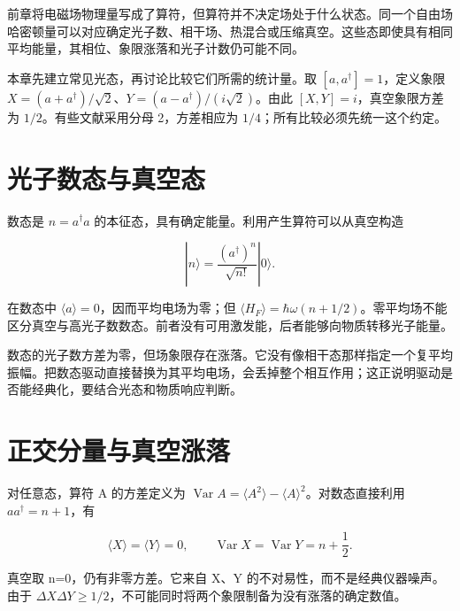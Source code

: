 \documentclass[UTF8,a4paper,zihao=-4,openany,fontset=fandol]{ctexbook}
\begin{document}
前章将电磁场物理量写成了算符，但算符并不决定场处于什么状态。同一个自由场哈密顿量可以对应确定光子数、相干场、热混合或压缩真空。这些态即使具有相同平均能量，其相位、象限涨落和光子计数仍可能不同。



本章先建立常见光态，再讨论比较它们所需的统计量。取 $[a,a^\dagger]=1$，定义象限 $X=(a+a^\dagger)/\sqrt2$、$Y=(a-a^\dagger)/(i\sqrt2)$。由此 $[X,Y]=i$，真空象限方差为 $1/2$。有些文献采用分母 2，方差相应为 $1/4$；所有比较必须先统一这个约定。



\section{光子数态与真空态}\label{sec:02:1}


数态是 $n=a^\dagger a$ 的本征态，具有确定能量。利用产生算符可以从真空构造



\begin{equation*}
|n\rangle=\frac{(a^\dagger)^n}{\sqrt{n!}}|0\rangle.
\tag{2.1}\label{eq:2.1}
\end{equation*}


在数态中 $\langle a\rangle=0$，因而平均电场为零；但 $\langle H_F\rangle=\hbar\omega(n+1/2)$。零平均场不能区分真空与高光子数数态。前者没有可用激发能，后者能够向物质转移光子能量。



数态的光子数方差为零，但场象限存在涨落。它没有像相干态那样指定一个复平均振幅。把数态驱动直接替换为其平均电场，会丢掉整个相互作用；这正说明驱动是否能经典化，要结合光态和物质响应判断。



\section{正交分量与真空涨落}\label{sec:02:2}


对任意态，算符 A 的方差定义为 $\operatorname{Var}A=\langle A^2\rangle-\langle A\rangle^2$。对数态直接利用 $aa^\dagger=n+1$，有



\begin{equation*}
\langle X\rangle=\langle Y\rangle=0,\qquad
\operatorname{Var}X=\operatorname{Var}Y=n+\frac12.
\tag{2.2}\label{eq:2.2}
\end{equation*}


真空取 n=0，仍有非零方差。它来自 X、Y 的不对易性，而不是经典仪器噪声。由于 $\Delta X\Delta Y\ge1/2$，不可能同时将两个象限制备为没有涨落的确定数值。
\end{document}
